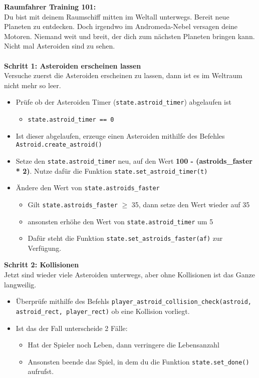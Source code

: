 \textbf{\large Raumfahrer Training 101:}\\
Du bist mit deinem Raumschiff mitten im Weltall unterwegs. Bereit neue Planeten zu entdecken. Doch irgendwo im Andromeda-Nebel versagen deine Motoren. Niemand weit und breit, der dich zum nächsten Planeten bringen kann. Nicht mal Asteroiden sind zu sehen.\\\\
\textbf{Schritt 1: Asteroiden erscheinen lassen}\\
Versuche zuerst die Asteroiden erscheinen zu lassen, dann ist es im Weltraum nicht mehr so leer.
\begin{itemize}
	\item Prüfe ob der Asteroiden Timer (\texttt{state.astroid\_timer}) abgelaufen ist
	\begin{itemize}
		\item \texttt{state.astroid\_timer == 0}
	\end{itemize}
	\item Ist dieser abgelaufen, erzeuge einen Asteroiden mithilfe des Befehles \texttt{Astroid.create\_astroid()}
	\item Setze den \texttt{state.astroid\_timer} neu, auf den Wert \textbf{100 - (astroids\_faster * 2)}. Nutze dafür die Funktion \texttt{state.set\_astroid\_timer(t)}
	\item Ändere den Wert von \texttt{state.astroids\_faster}
	\begin{itemize}
		\item Gilt \texttt{state.astroids\_faster} $\geq$ 35, dann setze den Wert wieder auf 35
		\item ansonsten erhöhe den Wert von \texttt{state.astroid\_timer} um 5
		\item Dafür steht die Funktion \texttt{state.set\_astroids\_faster(af)} zur Verfügung.
	\end{itemize}
\end{itemize}
\textbf{Schritt 2: Kollisionen}\\
Jetzt sind wieder viele Asteroiden unterwegs, aber ohne Kollisionen ist das Ganze langweilig.
\begin{itemize}
	\item Überprüfe mithilfe des Befehls \texttt{player\_astroid\_collision\_check(astroid, astroid\_rect, player\_rect)} ob eine Kollision vorliegt.
	\item Ist das der Fall unterscheide 2 Fälle:
	\begin{itemize}
		\item Hat der Spieler noch Leben, dann verringere die Lebensanzahl
		\item Ansonsten beende das Spiel, in dem du die Funktion \texttt{state.set\_done()} aufrufst.
	\end{itemize}
\end{itemize}
